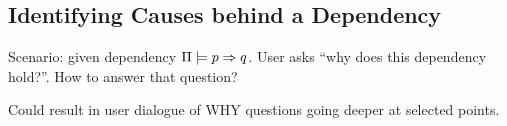 







\subsection{Identifying Causes behind a Dependency}
\label{xpp:identify-causes}

Scenario: given dependency $\Pi \models p \Rightarrow q$. User
asks ``why does this dependency hold?''. How to answer that question?

Could result in user dialogue of WHY questions going deeper at
selected points.




















